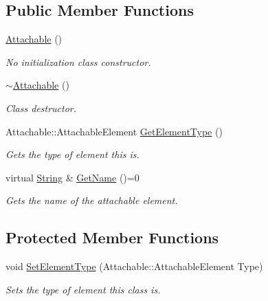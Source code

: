 \subsection*{Public Member Functions}
\begin{DoxyCompactItemize}
\item 
\hypertarget{classphys_1_1Attachable_a93c18f22769a1f70ae300fc2c58210eb}{
\hyperlink{classphys_1_1Attachable_a93c18f22769a1f70ae300fc2c58210eb}{Attachable} ()}
\label{df/dbd/classphys_1_1Attachable_a93c18f22769a1f70ae300fc2c58210eb}

\begin{DoxyCompactList}\small\item\em No initialization class constructor. \item\end{DoxyCompactList}\item 
\hypertarget{classphys_1_1Attachable_af7187e29053b7fe339634394883729d4}{
\hyperlink{classphys_1_1Attachable_af7187e29053b7fe339634394883729d4}{$\sim$Attachable} ()}
\label{df/dbd/classphys_1_1Attachable_af7187e29053b7fe339634394883729d4}

\begin{DoxyCompactList}\small\item\em Class destructor. \item\end{DoxyCompactList}\item 
Attachable::AttachableElement \hyperlink{classphys_1_1Attachable_a5f747000367afd85dfaff3a37976e74c}{GetElementType} ()
\begin{DoxyCompactList}\small\item\em Gets the type of element this is. \item\end{DoxyCompactList}\item 
\hypertarget{classphys_1_1Attachable_ad1a9bbd300fe21c5cc7e5aa7e2c95b85}{
virtual \hyperlink{namespacephys_aa03900411993de7fbfec4789bc1d392e}{String} \& \hyperlink{classphys_1_1Attachable_ad1a9bbd300fe21c5cc7e5aa7e2c95b85}{GetName} ()=0}
\label{df/dbd/classphys_1_1Attachable_ad1a9bbd300fe21c5cc7e5aa7e2c95b85}

\begin{DoxyCompactList}\small\item\em Gets the name of the attachable element. \item\end{DoxyCompactList}\end{DoxyCompactItemize}
\subsection*{Protected Member Functions}
\begin{DoxyCompactItemize}
\item 
void \hyperlink{classphys_1_1Attachable_a74361315eba9e4f0ce288518c92541fa}{SetElementType} (Attachable::AttachableElement Type)
\begin{DoxyCompactList}\small\item\em Sets the type of element this class is. \item\end{DoxyCompactList}\end{DoxyCompactItemize}
